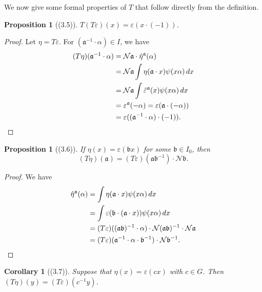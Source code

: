 \documentclass[12pt,a4paper]{article}
\theoremstyle{plain}
\newtheorem{proposition}[theorem]{Proposition}
\newtheorem{corollary}[theorem]{Corollary}
\theoremstyle{definition}
\begin{document}
We now give some formal properties of $T$ that follow directly from the definition.

\begin{proposition}[(3.5)]\label{prop:T2}
$T(T\varepsilon)(x)=\varepsilon(x\cdot(-1))$.
\end{proposition}

\begin{proof}
Let $\eta=T\varepsilon$. For $(\mathfrak{a}^{-1}\cdot\alpha)\in I$, we have
\begin{align*}
(T\eta)(\mathfrak{a}^{-1}\cdot\alpha)&=\mathcal{N}\mathfrak{a}\cdot\hat{\eta}^{\mathfrak{a}}(\alpha)\\
&=\mathcal{N}\mathfrak{a}\int\eta(\mathfrak{a}\cdot x)\psi(x\alpha)\,dx\\
&=\mathcal{N}\mathfrak{a}\int\hat{\varepsilon}^{\mathfrak{a}}(x)\psi(x\alpha)\,dx\\
&=\varepsilon^{\mathfrak{a}}(-\alpha)=\varepsilon(\mathfrak{a}\cdot(-\alpha))\\
&=\varepsilon((\mathfrak{a}^{-1}\cdot\alpha)\cdot(-1)).\qedhere
\end{align*}
\end{proof}

\begin{proposition}[(3.6)]\label{prop:T-shift}
If $\eta(x)=\varepsilon(\mathfrak{b}x)$ for some $\mathfrak{b}\in I_0$, then
\[
(T\eta)(\mathfrak{a})=(T\varepsilon)(\mathfrak{a}\mathfrak{b}^{-1})\cdot\mathcal{N}\mathfrak{b}.
\]
\end{proposition}

\begin{proof}
We have
\begin{align*}
\hat{\eta}^{\mathfrak{a}}(\alpha)&=\int\eta(\mathfrak{a}\cdot x)\psi(x\alpha)\,dx\\
&=\int\varepsilon(\mathfrak{b}\cdot(\mathfrak{a}\cdot x))\psi(x\alpha)\,dx\\
&=(T\varepsilon)((\mathfrak{a}\mathfrak{b})^{-1}\cdot\alpha)\cdot\mathcal{N}(\mathfrak{a}\mathfrak{b})^{-1}\cdot\mathcal{N}\mathfrak{a}\\
&=(T\varepsilon)(\mathfrak{a}^{-1}\cdot\alpha\cdot\mathfrak{b}^{-1})\cdot\mathcal{N}\mathfrak{b}^{-1}.\qedhere
\end{align*}
\end{proof}

\begin{corollary}[(3.7)]\label{cor:T-G}
Suppose that $\eta(x)=\varepsilon(cx)$ with $c\in G$. Then $(T\eta)(y)=(T\varepsilon)(c^{-1}y)$.
\end{corollary}
\end{document}
